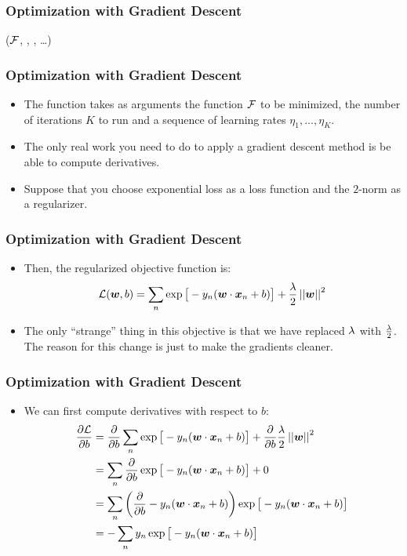 \documentclass[trans]{beamer}
\begin{document}
\begin{frame}
  \frametitle{Optimization with Gradient Descent}
%
  {($\mathcal{F}$, , , \dots)}
  {
\SETST{$\vz\kth$}{$\VARm{\vz\kpth} - \VARm{\eta}\VARm{\kth} \VARm{\vg\kth}$}
\ENDFOR
\RETURN \VARm{$\vz\Kth$}
}
\end{frame}

\begin{frame}
  \frametitle{Optimization with Gradient Descent}
\begin{itemize}
\item
The function takes as arguments the
function $\mathcal{F}$ to be minimized, the number of iterations $K$ to run
and a sequence of learning rates $\eta_1, \dots, \eta_K$. 
\item
The only real work you need to do to apply a gradient descent method
is be able to compute derivatives. 
\item Suppose that you
choose exponential loss as a loss function and the $2$-norm as a
regularizer. 
\end{itemize}
\end{frame}

\begin{frame}
  \frametitle{Optimization with Gradient Descent}
\begin{itemize}
\item  Then, the regularized objective function is:
%
\begin{equation}
\mathcal{L}({\boldsymbol{w}},b) =
\sum_n 
  \exp\big[-y_n (\boldsymbol{w} \cdot {\boldsymbol{x}}_n+b)\big] +
 \frac {\lambda} 2 \left\vert\left\vert {\boldsymbol{w}} \right\vert\right\vert^2
\end{equation}
%
\item The only ``strange'' thing in this objective is that we have replaced
$\lambda$ with $\frac {\lambda} 2$.  The reason for this change is just to make
the gradients cleaner.  
\end{itemize}
\end{frame}

\begin{frame}
  \frametitle{Optimization with Gradient Descent}
\begin{itemize}
\item
We can first compute derivatives with respect
to $b$:
%
\begin{align}
\frac {\partial\mathcal{L}} {\partial b}
&= \frac \partial {\partial b}\sum_n \exp\big[-y_n (\boldsymbol{w} \cdot {\boldsymbol{x}}_n+b)\big] + \frac \partial {\partial b}\frac {\lambda} 2 \left\vert\left\vert {\boldsymbol{w}} \right\vert\right\vert^2\\
&= \sum_n \frac \partial {\partial b} \exp\big[ -y_n (\boldsymbol{w} \cdot {\boldsymbol{x}}_n+b)\big] + 0\\
&= \sum_n \left( \frac \partial {\partial b} -y_n (\boldsymbol{w} \cdot {\boldsymbol{x}}_n+b) \right) \exp\big[ -y_n (\boldsymbol{w} \cdot {\boldsymbol{x}}_n+b)\big]\\
&= - \sum_n y_n \exp\big[ -y_n (\boldsymbol{w} \cdot {\boldsymbol{x}}_n+b)\big]
\end{align}
%
\end{itemize}
\end{frame}
\end{document}
